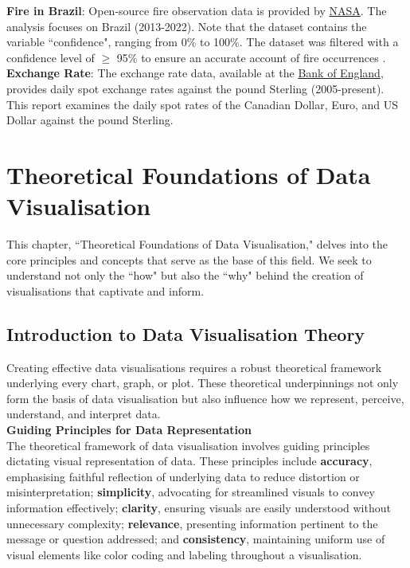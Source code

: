 \documentclass{article}\usepackage[]{graphicx}\usepackage[]{xcolor}
\numberwithin{equation}{section}
\begin{document}
\noindent
\textbf{Fire in Brazil}: Open-source fire observation data is provided by \href{https://firms.modaps.eosdis.nasa.gov/}{NASA}. The analysis focuses on Brazil (2013-2022). Note that the dataset contains the variable ``confidence", ranging from 0\% to 100\%. The dataset was filtered with a confidence level of $\ge$ 95\%  to ensure an accurate account of fire occurrences \cite{nasa_confidence}.\\

\noindent
\textbf{Exchange Rate}: The exchange rate data, available at the \href{https://www.bankofengland.co.uk/boeapps/database/index.asp?first=yes&SectionRequired=I&HideNums=-1&ExtraInfo=true&Travel=NIx}{Bank of England}, provides daily spot exchange rates against the pound Sterling (2005-present). This report examines the daily spot rates of the Canadian Dollar, Euro, and US Dollar against the pound Sterling.\\

\newpage 

\section{Theoretical Foundations of Data Visualisation}
This chapter, ``Theoretical Foundations of Data Visualisation," delves into the core principles and concepts that serve as the base of this field. We seek to understand not only the ``how" but also the ``why" behind the creation of visualisations that captivate and inform.

\subsection{Introduction to Data Visualisation Theory}
Creating effective data visualisations requires a robust theoretical framework underlying every chart, graph, or plot. These theoretical underpinnings not only form the basis of data visualisation but also influence how we represent, perceive, understand, and interpret data.\\ 

\noindent \textbf{Guiding Principles for Data Representation}\\
The theoretical framework of data visualisation involves guiding principles dictating visual representation of data. These principles include \textbf{accuracy}, emphasising faithful reflection of underlying data to reduce distortion or misinterpretation; \textbf{simplicity}, advocating for streamlined visuals to convey information effectively; \textbf{clarity}, ensuring visuals are easily understood without unnecessary complexity; \textbf{relevance}, presenting information pertinent to the message or question addressed; and \textbf{consistency}, maintaining uniform use of visual elements like color coding and labeling throughout a visualisation.\\
\end{document}
